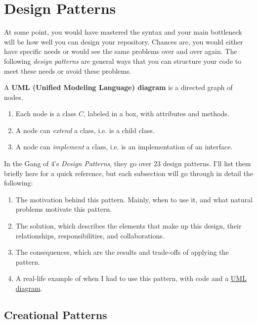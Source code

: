 \section{Design Patterns} 

  At some point, you would have mastered the syntax and your main bottleneck will be how well you can design your repository. Chances are, you would either have specific needs or would see the same problems over and over again. The following \textit{design patterns} are general ways that you can structure your code to meet these needs or avoid these problems. 

  \begin{definition}
    \label{def:uml-diagram}
    A \textbf{UML (Unified Modeling Language) diagram} is a directed graph of nodes. 
    \begin{enumerate}
      \item Each node is a class $C$, labeled in a box, with attributes and methods. 
      \item A node can \textit{extend} a class, i.e. is a child class. 
      \item A node can \textit{implement} a class, i.e. is an implementation of an interface. 
    \end{enumerate}
  \end{definition} 

  In the Gang of 4's \textit{Design Patterns}, they go over 23 design patterns. I'll list them briefly here for a quick reference, but each subsection will go through in detail the following: 
  \begin{enumerate}
    \item The motivation behind this pattern. Mainly, when to use it, and what natural problems motivate this pattern.  
    \item The solution, which describes the elements that make up this design, their relationships, responsibilities, and collaborations. 
    \item The consequences, which are the results and trade-offs of applying the pattern. 
    \item A real-life example of when I had to use this pattern, with code and a \hyperref[def:uml-diagram]{UML diagram}. 
  \end{enumerate}

\subsection{Creational Patterns} 

